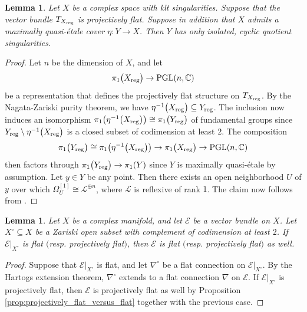 \documentclass[english,10pt]{amsart}
\newcommand{\sE}{\mathscr{E}}
\newcommand{\sL}{\mathscr{L}}
\newtheorem{lemma}[thm]{Lemma}
\theoremstyle{definition}
\theoremstyle{remark}
\numberwithin{equation}{section}
\begin{document}
\begin{lemma}\label{lemma:isolated_singularities}
Let $X$ be a complex space with klt singularities. Suppose that the vector bundle $T_{X_{\textup{reg}}}$ is projectively flat. Suppose in addition that $X$ admits a maximally quasi-\'etale cover $\eta \colon Y \to X$. Then $Y$ has only isolated, cyclic quotient singularities.
\end{lemma}

\begin{proof}
Let $n$ be the dimension of $X$, and let 
\[
\pi_1\big(X_{\textup{reg}}\big) \to \textup{PGL}(n,\mathbb{C})
\]
be a representation that defines the projectively flat structure on $T_{X_{\textup{reg}}}$. 
By the Nagata-Zariski purity theorem, we have $\eta^{-1}\big(X_{\textup{reg}}\big) \subseteq Y_{\textup{reg}}$.
The inclusion now induces an isomorphism $\pi_1\big(\eta^{-1}\big(X_{\textup{reg}}\big)\big)\cong 
\pi_1\big(Y_{\textup{reg}}\big)$ of fundamental groups since $Y_{\textup{reg}}\setminus \eta^{-1}\big(X_{\textup{reg}}\big)$ is a closed subset of codimension at least $2$. The composition
\[
\pi_1\big(Y_{\textup{reg}}\big) \cong \pi_1\big(\eta^{-1}\big(X_{\textup{reg}}\big)\big) \to \pi_1\big(X_{\textup{reg}}\big) \to \textup{PGL}(n,\mathbb{C})
\]
then factors through $\pi_1\big(Y_{\textup{reg}}\big) \to \pi_1(Y)$ since $Y$ is maximally quasi-\'etale by assumption. Let $y \in Y$ be any point. Then there exists an open neighborhood $U$ of $y$ over which $\Omega_U^{[1]} \cong \sL^{\oplus n}$, where $\sL$ is reflexive of rank $1$. The claim now follows from \cite[Proposition 4.1]{GKP_proj_flat_JEP}.
\end{proof}


\begin{lemma}\label{lemma:flat_extension}
Let $X$ be a complex manifold, and let $\sE$ be a vector bundle on $X$. Let $X^\circ \subseteq X$ be a Zariski open subset with complement of codimension at least $2$. If $\sE|_{X^\circ}$ is flat $($resp. projectively flat$)$, then $\sE$ is flat $($resp. projectively flat$)$ as well.
\end{lemma}

\begin{proof}
Suppose that $\sE|_{X^\circ}$ is flat, and let $\nabla^\circ$ be a flat connection on $\sE|_{X^\circ}$. By the Hartogs extension theorem, $\nabla^\circ$ extends to a flat connection $\nabla$ on $\sE$. If $\sE|_{X^\circ}$ is projectively flat, then $\sE$ is projectively flat as well by Proposition \ref{prop:projectively_flat_versus_flat} together with the previous case.
\end{proof}
\end{document}
